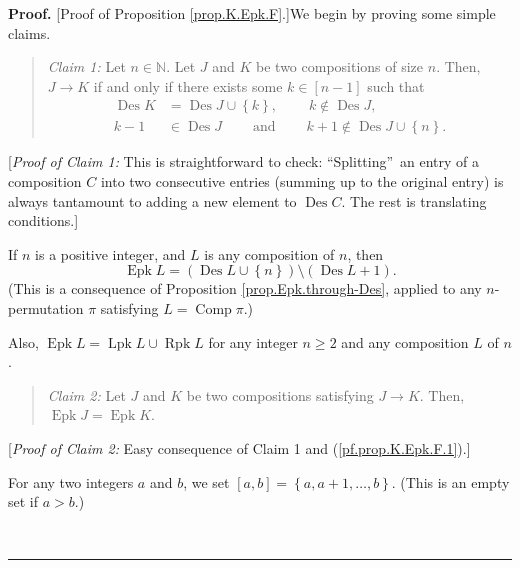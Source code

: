 \documentclass[numbers=enddot,12pt,final,onecolumn,notitlepage]{scrartcl}%
\theoremstyle{definition}
\newenvironment{statement}{\begin{quote}}{\end{quote}}
\newenvironment{proof}[1][Proof]{\noindent\textbf{#1.} }{\ \rule{0.5em}{0.5em}}
\newenvironment{verlong}{}{}
\newenvironment{noncompile}{}{}
\begin{document}
\begin{verlong}
\begin{proof}
[Proof of Proposition \ref{prop.K.Epk.F}.]We begin by proving some simple claims.

\begin{statement}
\textit{Claim 1:} Let $n\in\mathbb{N}$. Let $J$ and $K$ be two compositions of
size $n$. Then, $J\rightarrow K$ if and only if there exists some $k\in\left[
n-1\right]  $ such that
\begin{align*}
\operatorname{Des}K  &  =\operatorname{Des}J\cup\left\{  k\right\}
,\ \ \ \ \ \ \ \ \ \ k\notin\operatorname{Des}J,\\
k-1  &  \in\operatorname{Des}J\ \ \ \ \ \ \ \ \ \ \text{and}%
\ \ \ \ \ \ \ \ \ \ k+1\notin\operatorname{Des}J\cup\left\{  n\right\}  .
\end{align*}

\end{statement}

[\textit{Proof of Claim 1:} This is straightforward to check:
\textquotedblleft Splitting\textquotedblright\ an entry of a composition $C$
into two consecutive entries (summing up to the original entry) is always
tantamount to adding a new element to $\operatorname{Des}C$. The rest is
translating conditions.]

If $n$ is a positive integer, and $L$ is any composition of $n$, then
\begin{equation}
\operatorname{Epk}L=\left(  \operatorname{Des}L\cup\left\{  n\right\}
\right)  \setminus\left(  \operatorname{Des}L+1\right)  .
\label{pf.prop.K.Epk.F.1}%
\end{equation}
(This is a consequence of Proposition \ref{prop.Epk.through-Des}, applied to
any $n$-permutation $\pi$ satisfying $L=\operatorname*{Comp}\pi$.)

\begin{noncompile}
Also, $\operatorname{Epk}L=\operatorname*{Lpk}L\cup\operatorname*{Rpk}L$ for
any integer $n\geq2$ and any composition $L$ of $n$.
\end{noncompile}

\begin{statement}
\textit{Claim 2:} Let $J$ and $K$ be two compositions satisfying $J\rightarrow
K$. Then, $\operatorname{Epk}J=\operatorname{Epk}K$.
\end{statement}

[\textit{Proof of Claim 2:} Easy consequence of Claim 1 and
(\ref{pf.prop.K.Epk.F.1}).]

For any two integers $a$ and $b$, we set $\left[  a,b\right]  =\left\{
a,a+1,\ldots,b\right\}  $. (This is an empty set if $a>b$.)


\end{proof}
\end{verlong}
\end{document}
